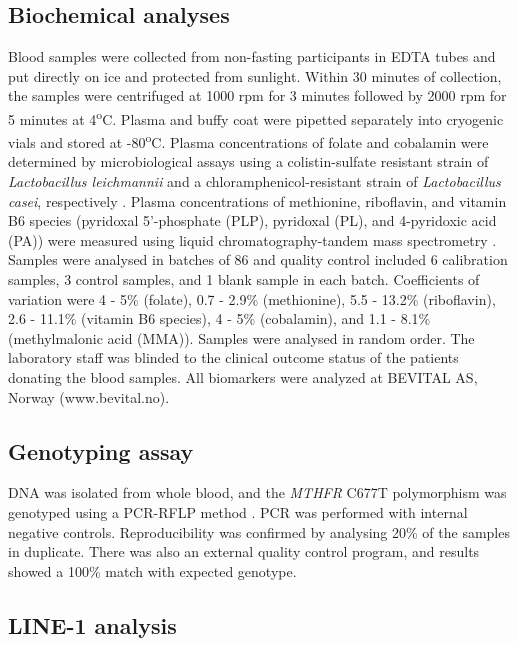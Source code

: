 \subsection{Biochemical analyses} %
\noindent Blood samples were collected from non-fasting participants in EDTA tubes and put directly on ice and protected from sunlight. Within 30 minutes of collection, the samples were centrifuged at 1000 rpm for 3 minutes followed by 2000 rpm for 5 minutes at 4\textsuperscript{o}C. Plasma and buffy coat were pipetted separately into cryogenic vials and stored at -80\textsuperscript{o}C. Plasma concentrations of folate and cobalamin were determined by microbiological assays using a colistin-sulfate resistant strain of \emph{Lactobacillus leichmannii} and a chloramphenicol-resistant strain of \emph{Lactobacillus casei}, respectively \cite{c545,c546}. Plasma concentrations of methionine, riboflavin, and vitamin B6 species (pyridoxal 5'-phosphate (PLP), pyridoxal (PL), and 4-pyridoxic acid (PA)) were measured using liquid chromatography-tandem mass spectrometry \cite{c547,c548}. Samples were analysed in batches of 86 and quality control included 6 calibration samples, 3 control samples, and 1 blank sample in 
each batch. Coefficients of variation were 4 - 5\% (folate), 0.7 - 2.9\% (methionine), 5.5 - 13.2\% (riboflavin), 2.6 - 11.1\% (vitamin B6 species), 4 - 5\% (cobalamin), and 1.1 - 8.1\% (methylmalonic acid (MMA)). Samples were analysed in random order. The laboratory staff was blinded to the clinical outcome status of the patients donating the blood samples. All biomarkers were analyzed at BEVITAL AS, Norway (www.bevital.no).

\subsection{Genotyping assay} %
\noindent DNA was isolated from whole blood, and the \emph{MTHFR} C677T polymorphism was genotyped using a PCR-RFLP method \cite{c549}. PCR was performed with internal negative controls. Reproducibility was confirmed by analysing 20\% of the samples in duplicate. There was also an external quality control program, and results showed a 100\% match with expected genotype. 

\subsection{LINE-1 analysis} %
